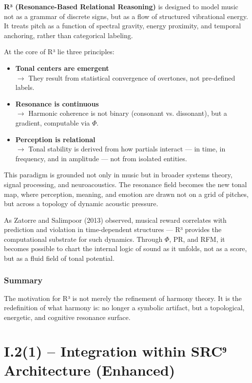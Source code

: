 \documentclass{article}
\begin{document}
\textbf{R³ (Resonance-Based Relational Reasoning)} is designed to model music not as a grammar of discrete signs, but as a flow of structured vibrational energy. It treats pitch as a function of spectral gravity, energy proximity, and temporal anchoring, rather than categorical labeling.

At the core of R³ lie three principles:

\begin{itemize}
    \item \textbf{Tonal centers are emergent}\\
    $\rightarrow$ They result from statistical convergence of overtones, not pre-defined labels.
    
    \item \textbf{Resonance is continuous}\\
    $\rightarrow$ Harmonic coherence is not binary (consonant vs. dissonant), but a gradient, computable via $\Phi$.
    
    \item \textbf{Perception is relational}\\
    $\rightarrow$ Tonal stability is derived from how partials interact — in time, in frequency, and in amplitude — not from isolated entities.
\end{itemize}

This paradigm is grounded not only in music but in broader systems theory, signal processing, and neuroacoustics. The resonance field becomes the new tonal map, where perception, meaning, and emotion are drawn not on a grid of pitches, but across a topology of dynamic acoustic pressure.

As Zatorre and Salimpoor (2013) observed, musical reward correlates with prediction and violation in time-dependent structures — R³ provides the computational substrate for such dynamics. Through $\Phi$, PR, and RFM, it becomes possible to chart the internal logic of sound as it unfolds, not as a score, but as a fluid field of tonal potential.

\subsubsection*{Summary}

The motivation for R³ is not merely the refinement of harmony theory. It is the redefinition of what harmony is: no longer a symbolic artifact, but a topological, energetic, and cognitive resonance surface.

\section*{I.2(1) – Integration within SRC⁹ Architecture (Enhanced)}
\end{document}
